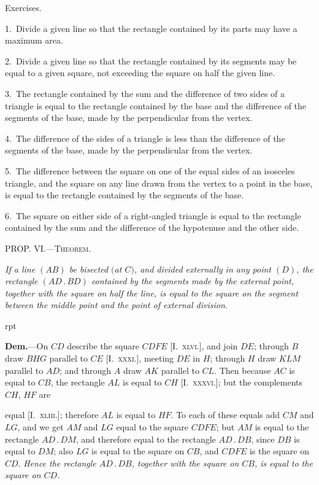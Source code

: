 \documentclass[oneside]{book}
\newcounter{wrapwidth}
\newcommand\mypropl[2]{
\bigskip\Needspace*{4\baselineskip}\begin{center}\textsc{#1}\end{center}
\hspace{\parindent}\emph{#2}\par\medskip
}
\newcommand\exhead[1]{
\Needspace*{5\baselineskip}\begin{center}
\textsf{#1}
\end{center}
}
\newcommand\imgflow[3]{
\setcounter{wrapwidth}{#1}

\begin{wrapfigure}[#2]{r}{\value{wrapwidth}pt}
\begin{center}
\vspace{-0.3in}

\end{center}
\end{wrapfigure}
}
\begin{document}
\exhead{Exercises.}

\begin{footnotesize}
1.~Divide a given line so that the rectangle contained by its
parts may have a maximum area.

2.~Divide a given line so that the rectangle contained by its
segments may be equal to a given square, not exceeding the
square on half the given line.

3.~The rectangle contained by the sum and the difference of
two sides of a triangle is equal to the rectangle contained by the
base and the difference of the segments of the base, made by the
perpendicular from the vertex.

4.~The difference of the sides of a triangle is less than the
difference of the segments of the base, made by the perpendicular
from the vertex.

5.~The difference between the square on one of the equal sides
of an isosceles triangle, and the square on any line drawn from
the vertex to a point in the base, is equal to the rectangle contained
by the segments of the base.

6.~The square on either side of a right-angled triangle is equal
to the rectangle contained by the sum and the difference of the
hypotenuse and the other side.
\par\end{footnotesize}

\mypropl{PROP\@. VI\@.---Theorem.}{If a line $(AB)$ be bisected $($at $C)$, and divided externally
in any point $(D)$, the rectangle $(AD\,.\,BD)$ contained
by the segments made by the external point, together with
the square on half the line, is equal to the square on the
segment between the middle point and the point of external
division.}


\imgflow{150}{9}{f085}

\textbf{Dem.}---On $CD$ describe the square $CDFE$ [I.~\textsc{xlvi}.],
and join $DE$; through $B$
draw $BHG$ parallel to $CE$
[I.~\textsc{xxxi}.], meeting $DE$ in
$H$; through $H$ draw $KLM$
parallel to $AD$; and through
$A$ draw $AK$ parallel to $CL$.
Then because $AC$ is equal to
$CB$, the rectangle $AL$ is equal
to $CH$ [I.~\textsc{xxxvi}.]; but the complements $CH$, $HF$ are

equal [I.~\textsc{xliii}.]; therefore $AL$ is equal to $HF$. To
each of these equals add $CM$ and $LG$, and we get $AM$
and $LG$ equal to the square $CDFE$; but $AM$ is equal to
the rectangle $AD\,.\,DM$, and therefore equal to the
rectangle $AD\,.\,DB$, since $DB$ is equal to $DM$; also $LG$
is equal to the square on $CB$, and $CDFE$ is the square
on $CD$. \textit{Hence the rectangle $AD\,.\,DB$, together with the
square on $CB$, is equal to the square on $CD$.} 
\end{document}
